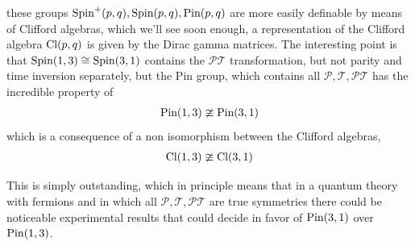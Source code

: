 these groups $\textnormal{Spin}^+(p,q),\textnormal{Spin}(p,q),\textnormal{Pin}(p,q)$ are more easily definable by means of Clifford algebras, 
which we'll see soon enough, a representation of the Clifford algebra $\textnormal{Cl}(p,q)$ is given by the Dirac gamma matrices. The interesting point is 
that $\textnormal{Spin}(1,3)\cong \textnormal{Spin}(3,1)$ contains the $\mathcal P\mathcal T$ transformation, but not parity and time inversion separately, 
but the Pin group, which contains all $\mathcal P,\mathcal T,\mathcal P\mathcal T$ has the incredible property of
\begin{align}
    \textnormal{Pin}(1,3)\ncong\textnormal{Pin}(3,1)
\end{align}
which is a consequence of a non isomorphism between the Clifford algebras,
\begin{align}
    \textnormal{Cl}(1,3)\ncong\textnormal{Cl}(3,1)
\end{align}

This is simply outstanding, which in principle means that in a quantum theory with fermions and in which all $\mathcal P,\mathcal T,\mathcal P\mathcal T$ are 
true symmetries there could be noticeable experimental results that could decide in favor of $\textnormal{Pin}(3,1)$ over $\textnormal{Pin}(1,3)$.